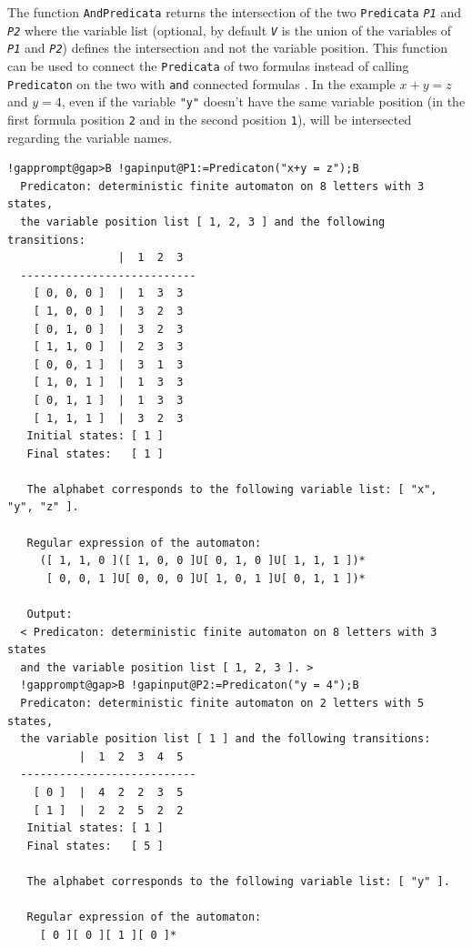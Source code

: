 \documentclass[a4paper,11pt]{report}
\begin{document}
{{{ The function \texttt{AndPredicata} returns the intersection of the two \texttt{Predicata} \mbox{\texttt{\mdseries\slshape P1}} and \mbox{\texttt{\mdseries\slshape P2}} where the variable list (optional, by default \mbox{\texttt{\mdseries\slshape V}} is the union of the variables of \mbox{\texttt{\mdseries\slshape P1}} and \mbox{\texttt{\mdseries\slshape P2}}) defines the intersection and not the variable position. This function can be
used to connect the \texttt{Predicata} of two formulas instead of calling \texttt{Predicaton} on the two with \texttt{and} connected formulas . In the example $x+y = z$ and $y = 4$, even if the variable \texttt{"y"} doesn't have the same variable position (in the first formula position \texttt{2} and in the second position \texttt{1}), will be intersected regarding the variable names. 
\begin{Verbatim}[commandchars=!@B,fontsize=\small,frame=single,label=Example]
  !gapprompt@gap>B !gapinput@P1:=Predicaton("x+y = z");B
  Predicaton: deterministic finite automaton on 8 letters with 3 states, 
  the variable position list [ 1, 2, 3 ] and the following transitions:
                 |  1  2  3  
  ---------------------------
    [ 0, 0, 0 ]  |  1  3  3  
    [ 1, 0, 0 ]  |  3  2  3  
    [ 0, 1, 0 ]  |  3  2  3  
    [ 1, 1, 0 ]  |  2  3  3  
    [ 0, 0, 1 ]  |  3  1  3  
    [ 1, 0, 1 ]  |  1  3  3  
    [ 0, 1, 1 ]  |  1  3  3  
    [ 1, 1, 1 ]  |  3  2  3  
   Initial states: [ 1 ]
   Final states:   [ 1 ]
  
   The alphabet corresponds to the following variable list: [ "x", "y", "z" ].
  
   Regular expression of the automaton:
     ([ 1, 1, 0 ]([ 1, 0, 0 ]U[ 0, 1, 0 ]U[ 1, 1, 1 ])*
      [ 0, 0, 1 ]U[ 0, 0, 0 ]U[ 1, 0, 1 ]U[ 0, 1, 1 ])*
  
   Output:
  < Predicaton: deterministic finite automaton on 8 letters with 3 states 
  and the variable position list [ 1, 2, 3 ]. >
  !gapprompt@gap>B !gapinput@P2:=Predicaton("y = 4");B
  Predicaton: deterministic finite automaton on 2 letters with 5 states, 
  the variable position list [ 1 ] and the following transitions:
           |  1  2  3  4  5  
  ---------------------------
    [ 0 ]  |  4  2  2  3  5  
    [ 1 ]  |  2  2  5  2  2  
   Initial states: [ 1 ]
   Final states:   [ 5 ]
  
   The alphabet corresponds to the following variable list: [ "y" ].
  
   Regular expression of the automaton:
     [ 0 ][ 0 ][ 1 ][ 0 ]*
  

\end{Verbatim}}}}
\end{document}
